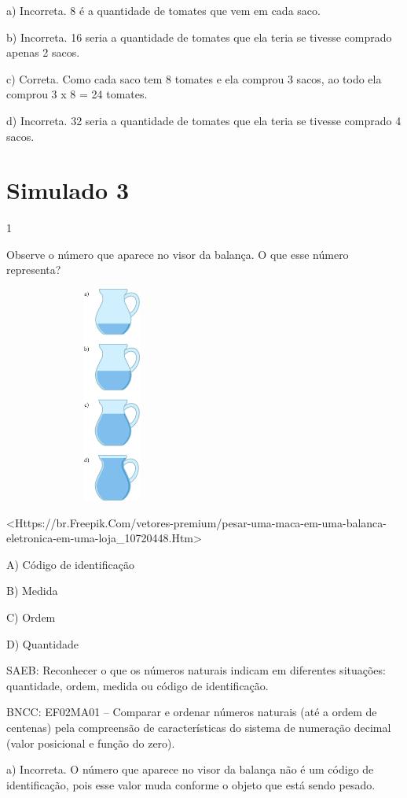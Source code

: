 \begin{escolha}
\begin{escolha}
{{{{{{{{a) Incorreta. 8 é a quantidade de tomates que vem em cada saco.

b) Incorreta. 16 seria a quantidade de tomates que ela teria se tivesse
comprado apenas 2 sacos.

c) Correta. Como cada saco tem 8 tomates e ela comprou 3 sacos, ao todo
ela comprou 3 x 8 = 24 tomates.

d) Incorreta. 32 seria a quantidade de tomates que ela teria se tivesse
comprado 4 sacos.

\chapter{Simulado 3}

\num{1}

Observe o número que aparece no visor da balança. O que esse número
representa?

\includegraphics[width=2.80208in,height=2.80208in]{media/image141.png}

\textless{}Https://br.Freepik.Com/vetores-premium/pesar-uma-maca-em-uma-balanca-eletronica-em-uma-loja\_10720448.Htm\textgreater{}

A) Código de identificação

B) Medida

C) Ordem

D) Quantidade

SAEB: Reconhecer o que os números naturais indicam em diferentes
situações: quantidade, ordem, medida ou código de identificação.

BNCC: EF02MA01 -- Comparar e ordenar números naturais (até a ordem de
centenas) pela compreensão de características do sistema de numeração
decimal (valor posicional e função do zero).

a) Incorreta. O número que aparece no visor da balança não é um código
de identificação, pois esse valor muda conforme o objeto que está sendo
pesado.

}}}}}}}}
\end{escolha}
\end{escolha}
